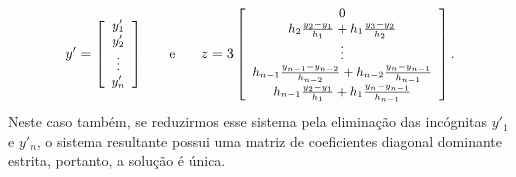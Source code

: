 \begin{equation*}
	\begin{small}
			y'= \left[\begin{array}{c}
				y'_1\\
				y'_2\\
				\vdots\\
				y'_n
		\end{array}\right]\qquad \text{e}\qquad
		z = 3\left[\begin{array}{c}
				0\\
				h_2\frac{y_2-y_1}{h_1}+h_1\frac{y_3-y_2}{h_2}\\
				\vdots\\
				h_{n-1}\frac{y_{n-1}-y_{n-2}}{h_{n-2}}+h_{n-2}\frac{y_n-y_{n-1}}{h_{n-1}}\\
				h_{n-1}\frac{y_2-y_1}{h_1}+h_1\frac{y_n-y_{n-1}}{h_{n-1}}\\
			\end{array}\right].
	\end{small}
\end{equation*}
Neste caso também, se reduzirmos esse sistema pela eliminação das incógnitas $y'_1$ e $y'_n$, o sistema resultante possui uma matriz de coeficientes diagonal dominante estrita, portanto, a solução é única.



